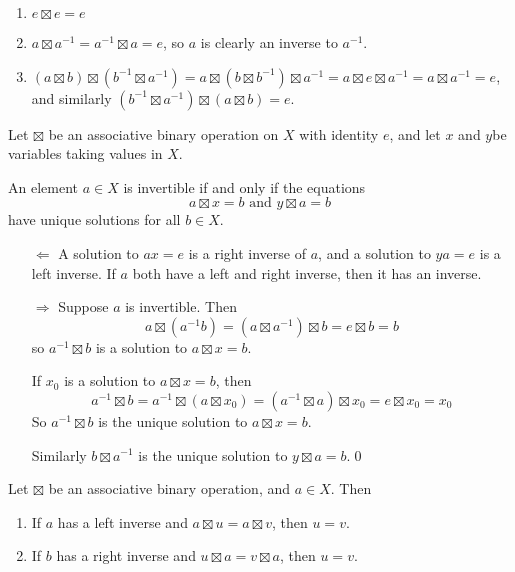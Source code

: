 \begin{pf}
\begin{enumerate}
\item $e\boxtimes e = e$
\item $a\boxtimes a^{-1}= a^{-1} {\boxtimes} a = e$, so $a$ is clearly an inverse to $a^{-1}$.
\item $(a\boxtimes b) \boxtimes (b^{-1}\boxtimes a^{-1}) = a\boxtimes (b\boxtimes b^{-1})\boxtimes a^{-1} = a\boxtimes e\boxtimes a^{-1}= a\boxtimes a^{-1}=e$, and similarly $(b^{-1}\boxtimes a^{-1})\boxtimes (a\boxtimes b)=e$.
\end{enumerate}
\end{pf}

\begin{prop}
Let $\boxtimes$ be an associative binary operation on $X$ with identity $e$, and let $x$ and $y$be variables taking values in $X$.

An element $a\in X$ is invertible if and only if the equations
$$
a\boxtimes x=b \text{ and } y\boxtimes a=b
$$
have unique solutions for all $b\in X$.
\end{prop}

\begin{pfno}
\begin{itemize}
 \item[$\Leftarrow$] A solution to $ax=e$ is a right inverse of $a$, and a solution to $ya=e$ is a left inverse. If $a$ both have a left and right inverse, then it has an inverse.
\item[$\Rightarrow$] Suppose $a$ is invertible. Then
$$
a\boxtimes (a^{-1}b)=(a\boxtimes a^{-1})\boxtimes b = e\boxtimes b = b
$$
so $a^{-1}\boxtimes b$ is a solution to $a\boxtimes x=b$.

If $x_0$ is a solution to $a\boxtimes x=b$, then
$$
a^{-1}\boxtimes b=a^{-1}\boxtimes (a\boxtimes x_0) = (a^{-1}\boxtimes a)\boxtimes x_0=e\boxtimes x_0 = x_0
$$
So $a^{-1}\boxtimes b$ is the unique solution to $a\boxtimes x=b$.

Similarly $b\boxtimes a^{-1}$ is the unique solution to $y\boxtimes a=b$.\qed 
\end{itemize}
\end{pfno}

\begin{prop}
Let $\boxtimes$ be an associative binary operation, and $a\in X$. Then
\begin{enumerate}
\item If $a$ has a left inverse and $a\boxtimes u = a \boxtimes v$, then $u=v$.
\item If $b$ has a right inverse and $u\boxtimes a = v\boxtimes a$, then $u=v$.
\end{enumerate}
\end{prop}

